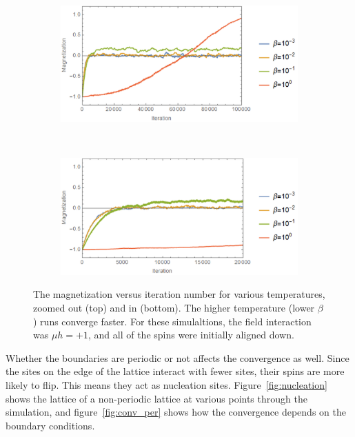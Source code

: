 \documentclass[]{article}
\begin{document}
\begin{figure}[htb]
	\centering
	\begin{subfigure}[b]{.9\textwidth}
		\includegraphics[width=\textwidth]{figures/m_v_t_beta_out.png}
	\end{subfigure}\\
	\begin{subfigure}[b]{.9\textwidth}
		\includegraphics[width=\textwidth]{figures/m_v_t_beta_in.png}
	\end{subfigure}
	\caption{The magnetization versus iteration number for various temperatures, zoomed out (top) and in (bottom). The higher temperature (lower $\beta$) runs converge faster. For these simulaltions, the field interaction was $\mu h = +1$, and all of the spins were initially aligned down.}
	\label{fig:conv_beta}
\end{figure}

Whether the boundaries are periodic or not affects the convergence as well.
Since the sites on the edge of the lattice interact with fewer sites, their spins are more likely to flip.
This means they act as nucleation sites.
Figure~\ref{fig:nucleation} shows the lattice of a non-periodic lattice at various points through the simulation, and figure~\ref{fig:conv_per} shows how the convergence depends on the boundary conditions.
\end{document}
